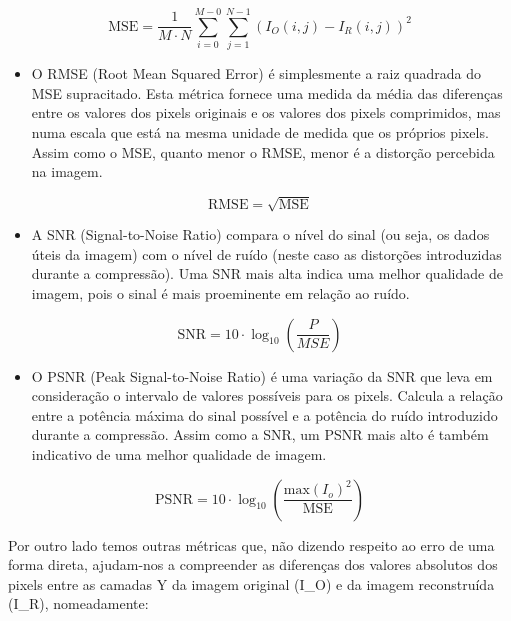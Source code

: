 \documentclass{article}
\begin{document}
\begin{equation}
\text{MSE} = \frac{1}{M \cdot N} \sum_{i=0}^{M-0} \sum_{j=1}^{N-1} (I_O(i, j) - I_R(i, j))^2
\end{equation}

\begin{itemize}
    \item O RMSE (Root Mean Squared Error) é simplesmente a raiz quadrada do MSE supracitado. Esta métrica fornece uma medida da média das diferenças entre os valores dos pixels originais e os valores dos pixels comprimidos, mas numa escala que está na mesma unidade de medida que os próprios pixels. Assim como o MSE, quanto menor o RMSE, menor é a distorção percebida na imagem.
\end{itemize}

\begin{equation}
\text{RMSE} = \sqrt{\text{MSE}}
\end{equation}

\begin{itemize}
    \item A SNR (Signal-to-Noise Ratio) compara o nível do sinal (ou seja, os dados úteis da imagem) com o nível de ruído (neste caso as distorções introduzidas durante a compressão). Uma SNR mais alta indica uma melhor qualidade de imagem, pois o sinal é mais proeminente em relação ao ruído.
\end{itemize}

\begin{equation}
\text{SNR} = 10 \cdot \log_{10} \left( \frac{P}{MSE} \right)
\end{equation}

\begin{itemize}
    \item O PSNR (Peak Signal-to-Noise Ratio) é uma variação da SNR que leva em consideração o intervalo de valores possíveis para os pixels. Calcula a relação entre a potência máxima do sinal possível e a potência do ruído introduzido durante a compressão. Assim como a SNR, um PSNR mais alto é também indicativo de uma melhor qualidade de imagem.
\end{itemize}

\begin{equation}
\text{PSNR} = 10 \cdot \log_{10} \left( \frac{{\text{max}\left(I_o\right)}^2}{\text{MSE}} \right)
\end{equation}

Por outro lado temos outras métricas que, não dizendo respeito ao erro de uma forma direta, ajudam-nos a compreender as diferenças dos valores absolutos dos pixels entre as camadas Y da imagem original (I\_O) e da imagem reconstruída (I\_R), nomeadamente:
\end{document}
